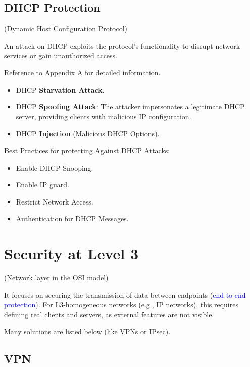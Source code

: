 \begin{center}
    \subsection{DHCP Protection}
\end{center}

\begin{center}
    (Dynamic Host Configuration Protocol)
\end{center}
An attack on DHCP exploits the protocol’s functionality to disrupt network services or gain unauthorized access. 

\begin{tcolorbox}[colback=red!10!white, colframe=red!70!black, coltitle=white, title=Be aware] 
    Reference to Appendix A for detailed information.
\end{tcolorbox}

\begin{itemize}
    \item DHCP \textbf{Starvation Attack}.
    \item DHCP \textbf{Spoofing Attack}: The attacker impersonates a legitimate DHCP server, providing clients with malicious IP configuration.
    \item DHCP \textbf{Injection} (Malicious DHCP Options).
\end{itemize}

Best Practices for protecting Against DHCP Attacks:
\begin{itemize}
    \item Enable DHCP Snooping.
    \item Enable IP guard.
    \item Restrict Network Access.
    \item Authentication for DHCP Messages.
\end{itemize}

\section{Security at Level 3}
(Network layer in the OSI model)

It focuses on securing the transmission of data between endpoints (\textcolor{Blue}{end-to-end protection}). For L3-homogeneous networks (e.g., IP networks), this requires defining real clients and servers, as external features are not visible.

Many solutions are listed below (like VPNs or IPsec).

\begin{center}
    \subsection{VPN}
\end{center}

